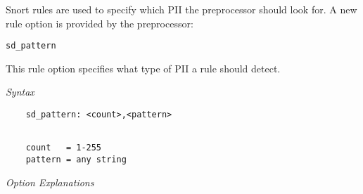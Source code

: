 \documentclass[english]{report}
\begin{document}
Snort rules are used to specify which PII the preprocessor should look for.
A new rule option is provided by the preprocessor:

\begin{verbatim}
sd_pattern
\end{verbatim}

This rule option specifies what type of PII a rule should detect.

\textit{Syntax}
\begin{verbatim}
    sd_pattern: <count>,<pattern>
\end{verbatim}
\footnotesize
\begin{verbatim}

    count   = 1-255
    pattern = any string
\end{verbatim}
\normalsize

\textit{Option Explanations}
\end{document}
